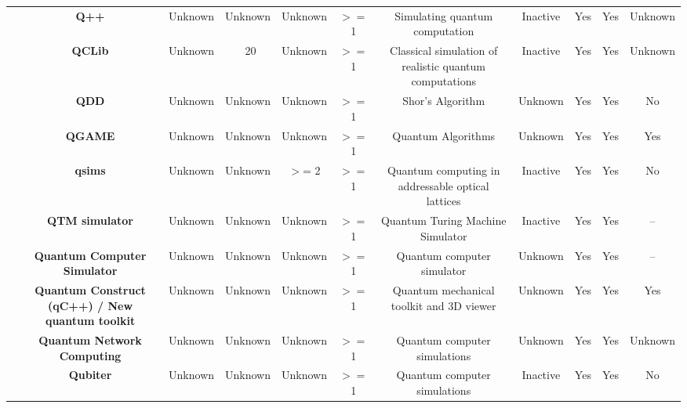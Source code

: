 \documentclass[conference]{IEEEtran}
\begin{document}
\begin{table*}[h!]
{\begin{tabular}{c|c|c|c|c|c|c|c|c|c|c}
	           & \textbf{Q++ } & Unknown & Unknown & Unknown & $>=$1 & Simulating quantum computation & Inactive & Yes   & Yes   & Unknown \\
	           & \textbf{QCLib } & Unknown &  ~20  & Unknown & $>=$1 & Classical simulation of realistic quantum computations & Inactive & Yes   & Yes   & Unknown \\
	           & \textbf{QDD } & Unknown & Unknown & Unknown & $>=$1 & Shor's Algorithm & Unknown & Yes   & Yes   & No \\
	           & \textbf{QGAME } & Unknown & Unknown & Unknown & $>=$1 & Quantum Algorithms & Unknown & Yes   & Yes   & Yes \\
	           & \textbf{qsims } & Unknown & Unknown & $>$= 2  & $>=$1 & Quantum computing in addressable optical lattices & Inactive & Yes   & Yes   & No \\
	           & \textbf{QTM simulator } & Unknown & Unknown & Unknown & $>=$1 & Quantum Turing Machine Simulator & Inactive & Yes   & Yes   & -- \\
	           & \textbf{Quantum Computer Simulator } & Unknown & Unknown & Unknown & $>=$1 & Quantum computer simulator & Unknown & Yes   & Yes   & -- \\
	           & \textbf{Quantum Construct (qC++)  / New quantum toolkit} & Unknown & Unknown & Unknown & $>=$1 & Quantum mechanical toolkit and 3D viewer & Unknown & Yes   & Yes   & Yes \\
	           & \textbf{Quantum Network Computing } & Unknown & Unknown & Unknown & $>=$1 & Quantum computer simulations & Unknown & Yes   & Yes   & Unknown \\
	           & \textbf{Qubiter } & Unknown & Unknown & Unknown & $>=$1 & Quantum computer simulations & Inactive & Yes   & Yes   & No \\

\end{tabular}}
\end{table*}
\end{document}
